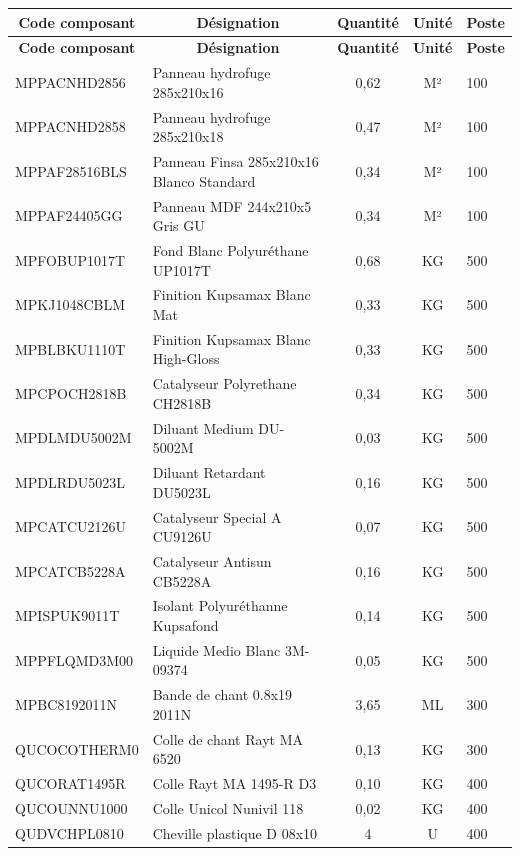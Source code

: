 \documentclass[12pt,a4paper]{article}
\begin{document}
\begin{longtable}{|p{3.5cm}|p{6cm}|c|c|p{2.5cm}|}
\hline
\multicolumn{1}{|c|}{\textbf{Code composant}} & \multicolumn{1}{c|}{\textbf{Désignation}} & \multicolumn{1}{c|}{\textbf{Quantité}} & \multicolumn{1}{c|}{\textbf{Unité}} & \multicolumn{1}{c|}{\textbf{Poste}} \\
\hline
\endfirsthead
\hline
\multicolumn{1}{|c|}{\textbf{Code composant}} & \multicolumn{1}{c|}{\textbf{Désignation}} & \multicolumn{1}{c|}{\textbf{Quantité}} & \multicolumn{1}{c|}{\textbf{Unité}} & \multicolumn{1}{c|}{\textbf{Poste}} \\
\hline
\endhead
\hline
\endfoot
MPPACNHD2856 & Panneau hydrofuge 285x210x16 & 0,62 & M² & 100 \\
MPPACNHD2858 & Panneau hydrofuge 285x210x18 & 0,47 & M² & 100 \\
MPPAF28516BLS & Panneau Finsa 285x210x16 Blanco Standard & 0,34 & M² & 100 \\
MPPAF24405GG & Panneau MDF 244x210x5 Gris GU & 0,34 & M² & 100 \\
MPFOBUP1017T & Fond Blanc Polyuréthane UP1017T & 0,68 & KG & 500 \\
MPKJ1048CBLM & Finition Kupsamax Blanc Mat & 0,33 & KG & 500 \\
MPBLBKU1110T & Finition Kupsamax Blanc High-Gloss & 0,33 & KG & 500 \\
MPCPOCH2818B & Catalyseur Polyrethane CH2818B & 0,34 & KG & 500 \\
MPDLMDU5002M & Diluant Medium DU-5002M & 0,03 & KG & 500 \\
MPDLRDU5023L & Diluant Retardant DU5023L & 0,16 & KG & 500 \\
MPCATCU2126U & Catalyseur Special A CU9126U & 0,07 & KG & 500 \\
MPCATCB5228A & Catalyseur Antisun CB5228A & 0,16 & KG & 500 \\
MPISPUK9011T & Isolant Polyuréthanne Kupsafond & 0,14 & KG & 500 \\
MPPFLQMD3M00 & Liquide Medio Blanc 3M-09374 & 0,05 & KG & 500 \\
MPBC8192011N & Bande de chant 0.8x19 2011N & 3,65 & ML & 300 \\
QUCOCOTHERM0 & Colle de chant Rayt MA 6520 & 0,13 & KG & 300 \\
QUCORAT1495R & Colle Rayt MA 1495-R D3 & 0,10 & KG & 400 \\
QUCOUNNU1000 & Colle Unicol Nunivil 118 & 0,02 & KG & 400 \\
QUDVCHPL0810 & Cheville plastique D 08x10 & 4 & U & 400 \\

\end{longtable}
\end{document}
